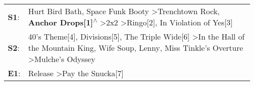 \begin{supertabular}{p{0.03\textwidth}p{0.92\textwidth}}
 \textbf{S1}:  &                                    Hurt Bird Bath\textsuperscript{}, \enspace Space Funk Booty\textsuperscript{} \textgreater \enspace Trenchtown Rock\textsuperscript{}, \enspace \textbf{Anchor Drops[1]\textsuperscript{$\wedge$}} \textgreater \enspace 2x2\textsuperscript{} \textgreater \enspace Ringo[2]\textsuperscript{}, \enspace In Violation of Yes[3]\textsuperscript{}  \enspace  \\
 \textbf{S2}:  &  40's Theme[4]\textsuperscript{}, \enspace Divisions[5]\textsuperscript{}, \enspace The Triple Wide[6]\textsuperscript{} \textgreater \enspace In the Hall of the Mountain King\textsuperscript{}, \enspace Wife Soup\textsuperscript{}, \enspace Lenny\textsuperscript{}, \enspace Miss Tinkle's Overture\textsuperscript{} \textgreater \enspace Mulche's Odyssey\textsuperscript{}  \enspace  \\
 \textbf{E1}:  &                                                                                                                                                                                                                                                                                                   Release\textsuperscript{} \textgreater \enspace Pay the Snucka[7]\textsuperscript{}  \enspace  \\
\end{supertabular}
